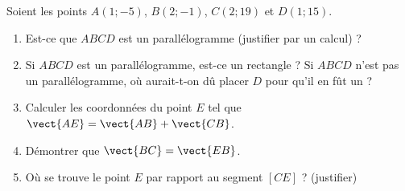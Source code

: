 
\begin{exercice}\label{exosmath-0670}

    Soient les points \( A(1;-5)\), \( B(2;-1)\), \( C(2;19)\) et \( D(1;15)\).
    \begin{enumerate}
        \item
            Est-ce que \( ABCD\) est un parallélogramme (justifier par un calcul) ?
        \item
            Si \( ABCD\) est un parallélogramme, est-ce un rectangle ? Si \( ABCD\) n'est pas un parallélogramme, où aurait-t-on dû placer \( D\) pour qu'il en fût un ?
        \item
            Calculer les coordonnées du point \( E\) tel que \( \vect{ AE }=\vect{ AB }+\vect{ CB }\).
        \item
            Démontrer que \( \vect{ BC }=\vect{ EB }\).
        \item
            Où se trouve le point \( E\) par rapport au segment \( [CE]\) ? (justifier)
    \end{enumerate}


\end{exercice}
